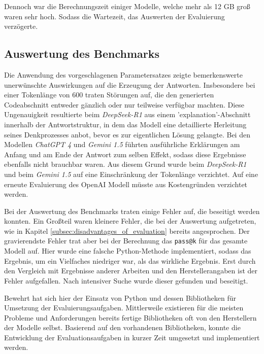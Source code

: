 Dennoch war die Berechnungszeit einiger Modelle, welche mehr als 12 GB groß waren sehr hoch. Sodass die Wartezeit, das Auswerten der Evaluierung verzögerte.


\subsection{Auswertung des Benchmarks}
Die Anwendung des vorgeschlagenen Parametersatzes zeigte bemerkenswerte unerwünschte Auswirkungen auf die Erzeugung der Antworten. Insbesondere bei einer Tokenlänge von 600 traten Störungen auf, die den generierten Codeabschnitt entweder gänzlich oder nur teilweise verfügbar machten. Diese Ungenauigkeit resultierte beim \textit{DeepSeek-R1} aus einem 'explanation'-Abschnitt innerhalb der Antwortstruktur, in dem das Modell eine detaillierte Herleitung seines Denkprozesses anbot, bevor es zur eigentlichen Lösung gelangte. Bei den Modellen \textit{ChatGPT 4} und \textit{Gemini 1.5} führten ausführliche Erklärungen am Anfang und am Ende der Antwort zum selben Effekt, sodass diese Ergebnisse ebenfalls nicht brauchbar waren. Aus diesem Grund wurde beim \textit{DeepSeek-R1} und beim \textit{Gemini 1.5} auf eine Einschränkung der Tokenlänge verzichtet. Auf eine erneute Evaluierung des OpenAI Modell müsste aus Kostengründen verzichtet werden.\vspace{0.2cm}

Bei der Auswertung des Benchmarks traten einige Fehler auf, die beseitigt werden konnten. Ein Großteil waren kleinere Fehler, die bei der Auswertung aufgetreten, wie in Kapitel \ref{subsec:disadvantages_of_evaluation} bereits angesprochen. Der gravierendste Fehler trat aber bei der Berechnung das \texttt{pass@k} für das gesamte Modell auf. Hier wurde eine falsche Python-Methode implementiert, sodass das Ergebnis, um ein Vielfaches niedriger war, als das wirkliche Ergebnis. Erst durch den Vergleich mit Ergebnisse anderer Arbeiten und den Herstellerangaben ist der Fehler aufgefallen. Nach intensiver Suche wurde dieser gefunden und beseitigt.\vspace{0.2cm}

Bewehrt hat sich hier der Einsatz von Python und dessen Bibliotheken für Umsetzung der Evaluierungsaufgaben. Mittlerweile existieren für die meisten Probleme und Anforderungen bereits fertige Bibliotheken oft von den Herstellern der Modelle selbst. Basierend auf den vorhandenen Bibliotheken, konnte die Entwicklung der Evaluationsaufgaben in kurzer Zeit umgesetzt und implementiert werden.\vspace{0.2cm}


